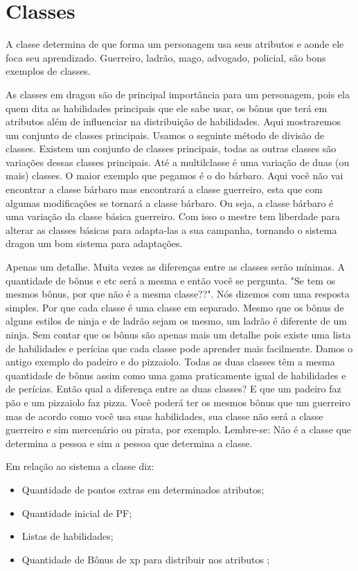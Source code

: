 
\chapter{Classes}
\label{Cap:classes}
A classe determina de que forma um personagem usa seus atributos e aonde ele foca seu aprendizado. Guerreiro, ladrão, mago, advogado, policial, são bons exemplos de classes.

As classes em dragon são de principal importância para um personagem, pois ela quem dita as habilidades principais que ele sabe usar, os bônus que terá em atributos além de influenciar na distribuição de habilidades. Aqui mostraremos um conjunto de classes principais. Usamos o seguinte método de divisão de classes. Existem um conjunto de classes principais, todas as outras classes são variações dessas classes principais. Até a multilclasse é uma variação de duas (ou mais) classes. O maior exemplo que pegamos é o do bárbaro. Aqui você não vai encontrar a classe bárbaro mas encontrará a classe guerreiro, esta que com algumas modificações se tornará a classe bárbaro. Ou seja, a classe bárbaro é uma variação da classe básica guerreiro. Com isso o mestre tem liberdade para alterar as classes básicas para adapta-las a sua campanha, tornando o sistema dragon um bom sistema para adaptações.

Apenas um detalhe. Muita vezes as diferenças entre as classes serão mínimas. A quantidade de bônus e etc será a mesma e então você se pergunta. "Se tem os mesmos bônus, por que não é a mesma classe??". Nós dizemos com uma resposta simples. Por que cada classe é uma classe em separado. Mesmo que os bônus de alguns estilos de ninja e de ladrão sejam os mesmo, um ladrão é diferente de um ninja. Sem contar que os bônus são apenas mais um detalhe pois existe uma lista de habilidades e perícias que cada classe pode aprender mais facilmente.
Damos o antigo exemplo do padeiro e do pizzaiolo. Todas as duas classes têm a mesma quantidade de bônus assim como uma gama praticamente igual de habilidades e de perícias. Então qual a diferença entre as duas classes? E que um padeiro faz pão e um pizzaiolo faz pizza. Você poderá ter os mesmos bônus que um guerreiro mas de acordo como você usa suas habilidades, sua classe não será a classe guerreiro e sim mercenário ou pirata, por exemplo. Lembre-se: Não é a classe que determina a pessoa e sim a pessoa que determina a classe.

Em relação ao sistema a classe diz:
\begin{itemize}
	\item Quantidade de pontos extras em determinados atributos;
	\item Quantidade inicial de PF;
	\item Listas de habilidades;
	\item Quantidade de Bônus de xp para distribuir nos atributos ;
\end{itemize}



